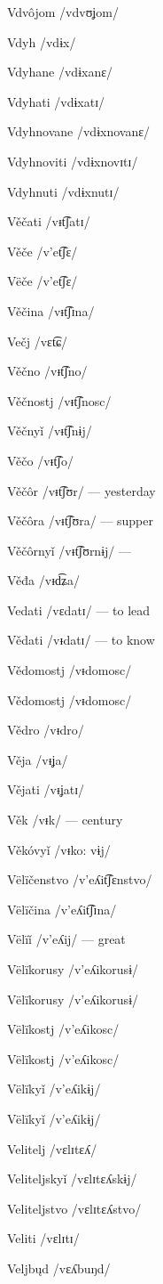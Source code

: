 Vdvôjom /vdvʊʝom/

Vdyh /vdɨx/

Vdyhane /vdɨxanɛ/

Vdyhati /vdɨxatɪ/

Vdyhnovane /vdɨxnovanɛ/

Vdyhnoviti /vdɨxnovɪtɪ/

Vdyhnuti /vdɨxnutɪ/

Věčati /vᵻt͡ʃatɪ/

Věče /v’et͡ʃɛ/

Vëče /v’et͡ʃɛ/

Věčina /vᵻt͡ʃɪna/

Večj /vɛt͡ɕ/

Věčno /vᵻt͡ʃno/

Věčnostj /vᵻt͡ʃnosc/

Věčnyǐ /vᵻt͡ʃnɨj/

Věčo /vᵻt͡ʃo/

Věčôr /vᵻt͡ʃʊr/ — yesterday

Věčôra /vᵻt͡ʃʊra/ — supper

Věčôrnyǐ /vᵻt͡ʃʊrnɨj/ —

Věđa /vᵻd͡ʑa/

Vedati /vɛdatɪ/ — to lead

Vědati /vᵻdatɪ/ — to know

Vědomostj /vᵻdomosc/

Vědomostj /vᵻdomosc/

Vědro /vᵻdro/

Věja /vᵻʝa/

Vějati /vᵻʝatɪ/

Věk /vᵻk/ — century

Věkóvyǐ /vᵻko: vɨj/

Vëlïčenstvo /v’eʎit͡ʃɛnstvo/

Vëlïčina /v’eʎit͡ʃɪna/

Vëlïǐ /v’eʎij/ — great

Vëlïkorusy /v’eʎikorusɨ/

Vëlïkorusy /v’eʎikorusɨ/

Vëlïkostj /v’eʎikosc/

Vëlïkostj /v’eʎikosc/

Vëlïkyǐ /v’eʎikɨj/

Vëlïkyǐ /v’eʎikɨj/

Velitelj /vɛlɪtɛʎ/

Veliteljskyǐ /vɛlɪtɛʎskɨj/

Veliteljstvo /vɛlɪtɛʎstvo/

Veliti /vɛlɪtɪ/

Veljbųd /vɛʎbuŋd/

